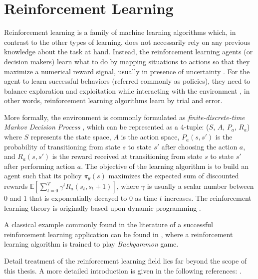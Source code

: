 \section{Reinforcement Learning}
Reinforcement learning is a family of machine learning algorithms which, in contrast to the other types of learning, does not necessarily rely on any previous knowledge about the task at hand. Instead, the reinforcement learning agents (or decision makers) learn what to do by mapping situations to actions \cite{sutton2018} so that they maximize a numerical reward signal, usually in presence of uncertainty \cite{haykin1998}. For the agent to learn successful behaviors (referred commonly as policies), they need to balance exploration and exploitation while interacting with the environment \cite{sutton2018}, in other words, reinforcement learning algorithms learn by trial and error. 

More formally, the environment is commonly formulated as \textit{finite-discrete-time Markov Decision Process} \cite{haykin1998}, which can be represented as a 4-tuple: ($S$, $A$, $P_a$, $R_a$) where $S$ represents the state space, $A$ is the action space, $P_a(s, s')$ is the probability of transitioning from state $s$ to state $s'$ after choosing the action $a$, and $R_a(s, s')$ is the reward received at transitioning from state $s$ to state $s'$ after performing action $a$. The objective of the learning algorithm is to build an agent such that its policy $\pi_\theta(s)$ maximizes the expected sum of discounted rewards $\mathbb{E} \left[ \sum_{t=0}^{T} \gamma^t R_a(s_t, s_t+1) \right]$, where $\gamma$ is usually a scalar number between 0 and 1 that is exponentially decayed to 0 as time $t$ increases. The reinforcement learning theory is originally based upon dynamic programming \cite{szepesvari2010}. 

A classical example commonly found in the literature of a successful reinforcement learning application can be found in \cite{tesauro1994}, where a reinforcement learning algorithm is trained to play \textit{Backgammon} game.

Detail treatment of the reinforcement learning field lies far beyond the scope of this thesis. A more detailed introduction is given in the following references: \cite{sutton2018, szepesvari2010}.

